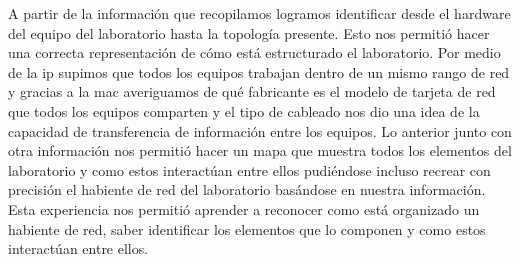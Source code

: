 ﻿\documentclass[spanish]{udpreport}
\begin{document}
A partir de la información que recopilamos logramos identificar desde el hardware del equipo del laboratorio hasta la topología presente. Esto nos permitió hacer una correcta representación de cómo está estructurado el laboratorio. Por medio de la ip supimos que todos los equipos trabajan dentro de un mismo rango de red y gracias a la mac averiguamos de qué fabricante es el modelo de tarjeta de red que todos los equipos comparten y el tipo de cableado nos dio una idea de la capacidad de transferencia de información entre los equipos. Lo anterior junto con otra información nos permitió hacer un mapa que muestra todos los elementos del laboratorio y como estos interactúan entre ellos pudiéndose incluso recrear con precisión el habiente de red del laboratorio basándose en nuestra información. Esta experiencia nos permitió aprender a reconocer como está organizado un habiente de red, saber identificar los elementos que lo componen y como estos interactúan entre ellos.
\end{document}
